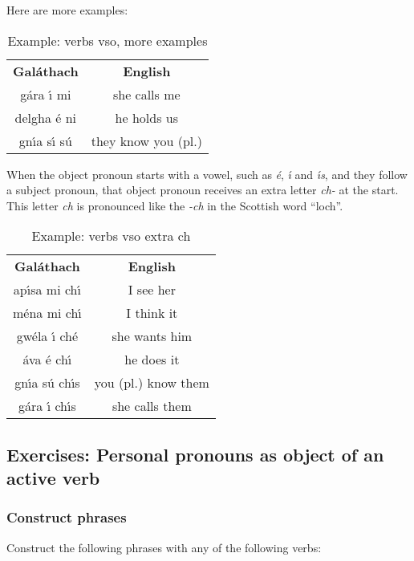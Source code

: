 Here are more examples:
\begin{table}[H]
\centering
\begin{tabular}{cc}
  \toprule
  \textbf{Gal\'{a}thach} & \textbf{English}\\
  \cmidrule(lr){1-1}\cmidrule(lr){2-2}
  g\'{a}ra \'{\i} mi & she calls me\\
  delgha \'{e} ni & he holds us\\
  gn\'{\i}a s\'{\i} s\'{u} & they know you (pl.)\\
  \bottomrule
\end{tabular}
\caption{Example: verbs vso, more examples}
\label{example_verbs_vso_more_examples}
\end{table}

When the object pronoun starts with a vowel, such as \textit{\'{e}}, \textit{\'{\i}} and \textit{\'{\i}s}, and they follow a subject pronoun, that object pronoun receives an extra letter \textit{ch-} at the start. This letter \textit{ch} is pronounced like the \textit{-ch} in the Scottish word ``loch''.
\begin{table}[H]
\centering
\begin{tabular}{cc}
  \toprule
  \textbf{Gal\'{a}thach} & \textbf{English}\\
  \cmidrule(lr){1-1}\cmidrule(lr){2-2}
  ap\'{\i}sa mi ch\'{\i} & I see her\\
  m\'{e}na mi ch\'{\i} & I think it\\
  gw\'{e}la \'{\i} ch\'{e} & she wants him\\
  \'{a}va \'{e} ch\'{\i} & he does it\\
  gn\'{\i}a s\'{u} ch\'{\i}s & you (pl.) know them\\
  g\'{a}ra \'{\i} ch\'{\i}s & she calls them\\
  \bottomrule
\end{tabular}
\caption{Example: verbs vso extra ch}
\label{example_verbs_vso_extra_ch}
\end{table}

\newpage
\subsection{Exercises: Personal pronouns as object of an active verb}

\subsubsection{Construct phrases}

Construct the following phrases with any of the following verbs:\\

